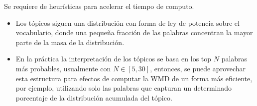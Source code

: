 \documentclass[
	spanish, %
	aspectratio=43, %
	hyperref={pdfencoding=auto,psdextra},
	xcolor={dvipsnames,table,usenames}
]{beamer}
\begin{document}
\begin{frame}
Se requiere de heurísticas para acelerar el tiempo de computo.
\begin{itemize}
  \item Los tópicos siguen una distribución con forma de ley de potencia sobre el vocabulario, donde una pequeña fracción de las palabras concentran la mayor parte de la masa de la distribución. 
  \item En la práctica la interpretación de los tópicos se basa en los top $N$ palabras más probables, usualmente con $N \in [5, 30]$, entonces, se puede aprovechar esta estructura para efectos de computar la WMD de un forma más eficiente, por ejemplo, utilizando solo las palabras que capturan un determinado porcentaje de la distribución acumulada del tópico.\\
\end{itemize}
\end{frame}
\end{document}
